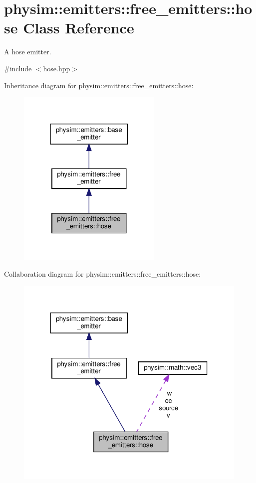 \hypertarget{classphysim_1_1emitters_1_1free__emitters_1_1hose}{}\section{physim\+:\+:emitters\+:\+:free\+\_\+emitters\+:\+:hose Class Reference}
\label{classphysim_1_1emitters_1_1free__emitters_1_1hose}


A hose emitter.  




{\ttfamily \#include $<$hose.\+hpp$>$}



Inheritance diagram for physim\+:\+:emitters\+:\+:free\+\_\+emitters\+:\+:hose\+:\nopagebreak
\begin{figure}[H]
\begin{center}
\leavevmode
\includegraphics[width=196pt]{classphysim_1_1emitters_1_1free__emitters_1_1hose__inherit__graph}
\end{center}
\end{figure}


Collaboration diagram for physim\+:\+:emitters\+:\+:free\+\_\+emitters\+:\+:hose\+:\nopagebreak
\begin{figure}[H]
\begin{center}
\leavevmode
\includegraphics[width=316pt]{classphysim_1_1emitters_1_1free__emitters_1_1hose__coll__graph}
\end{center}
\end{figure}
